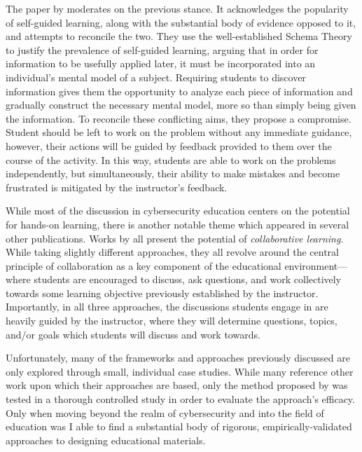     The paper by \textcite{R-Weiss} moderates on the previous stance. It acknowledges the popularity of self-guided learning, along with the substantial body of evidence opposed to it, and attempts to reconcile the two. They use the well-established Schema Theory to justify the prevalence of self-guided learning, arguing that in order for information to be usefully applied later, it must be incorporated into an individual's mental model of a subject. Requiring students to discover information gives them the opportunity to analyze each piece of information and gradually construct the necessary mental model, more so than simply being given the information. To reconcile these conflicting aims, they propose a compromise. Student should be left to work on the problem without any immediate guidance, however, their actions will be guided by feedback provided to them over the course of the activity. In this way, students are able to work on the problems independently, but simultaneously, their ability to make mistakes and become frustrated is mitigated by the instructor's feedback. 


    While most of the discussion in cybersecurity education centers on the potential for hands-on learning, there is another notable theme which appeared in several other publications. Works by \textcite{P-Deshpande, C-Kussmaul,B-Payne} all present the potential of \emph{collaborative learning}. While taking slightly different approaches, they all revolve around the central principle of collaboration as a key component of the educational environment---where students are encouraged to discuss, ask questions, and work collectively towards some learning objective previously established by the instructor. Importantly, in all three approaches, the discussions students engage in are heavily guided by the instructor, where they will determine questions, topics, and/or goals which students will discuss and work towards. 



    Unfortunately, many of the frameworks and approaches previously discussed are only explored through small, individual case studies. While many reference other work upon which their approaches are based, only the method proposed by \citeauthor{P-Deshpande} was tested in a thorough controlled study in order to evaluate the approach's efficacy. Only when moving beyond the realm of cybersecurity and into the field of education was I able to find a substantial body of rigorous, empirically-validated approaches to designing educational materials. 

